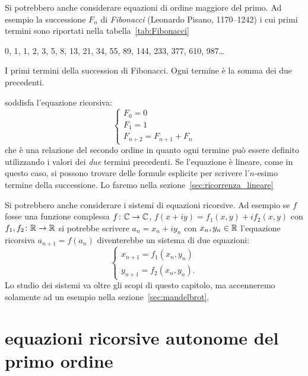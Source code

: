 Si potrebbero anche considerare equazioni di ordine maggiore del
primo. Ad esempio la successione $F_n$ di \emph{Fibonacci}
(Leonardo Pisano, 1170--1242)
i cui primi termini sono riportati nella tabella~\ref{tab:Fibonacci}
\begin{table}
  \begin{center}
  0, 1, 1, 2, 3, 5, 8, 13, 21, 34, 55, 89, 144,
  233, 377, 610, 987\dots
\end{center}
\caption{I primi termini della succession di Fibonacci.
Ogni termine è la somma dei due precedenti.}
\label{tab:Fibonacci}
\end{table}
%
%
%
soddisfa l'equazione ricorsiva:
\begin{equation}\label{eq:Fibonacci}
\begin{cases}
  F_0 = 0 \\
  F_1 = 1 \\
  F_{n+2} = F_{n+1} + F_n
\end{cases}
\end{equation}
che è una relazione del secondo ordine in quanto ogni termine può
essere definito utilizzando i valori dei \emph{due} termini precedenti.
Se l'equazione è lineare, come in questo caso, si possono trovare delle
formule esplicite per scrivere l'$n$-esimo termine della successione.
Lo faremo nella sezione~\ref{sec:ricorrenza_lineare}

Si potrebbero anche considerare i sistemi di equazioni ricorsive.
Ad esempio se $f$ fosse una funzione complessa $f\colon \mathbb C \to \mathbb C$,
$f(x+iy) = f_1(x,y) + i f_2(x,y)$ con $f_1,f_2 \colon \mathbb R\to\mathbb R$
si potrebbe scrivere $a_n = x_n + i y_n$ con $x_n, y_n \in \mathbb R$
l'equazione ricorsiva $a_{n+1} = f(a_n)$
diventerebbe un sistema di due equazioni:
\[
  \begin{cases}
    x_{n+1} = f_1(x_n, y_n)\\
    y_{n+1} = f_2(x_n, y_n).
  \end{cases}
\]
Lo studio dei sistemi va oltre gli scopi di questo capitolo,
ma accenneremo solamente ad un esempio nella sezione~\ref{sec:mandelbrot}.

\section{equazioni ricorsive autonome del primo ordine}

